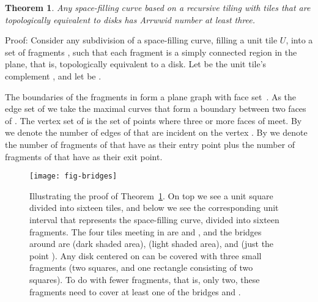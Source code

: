 \documentclass[11pt,a4paper]{article}
\newcommand{\unittile}{\ensuremath{U}\xspace}
\newtheorem{theorem}{Theorem}
\newenvironment{proof}{Proof:}{\qed}
\def\squareforqed{\hbox{\rlap{}}}
\def\qed{\ifmmode\squareforqed\else{\unskip\nobreak\hfil
\penalty50\hskip1em\null\nobreak\hfil\squareforqed
\parfillskip=0pt\finalhyphendemerits=0\endgraf}\fi}
\begin{document}
\begin{theorem}\label{th:2dsfclb}
Any space-filling curve based on a recursive tiling with tiles that are topologically equivalent to disks has Arrwwid number at least three.
\end{theorem}
\begin{proof}
Consider any subdivision of a space-filling curve, filling a unit tile \unittile, into a set  of  fragments , such that each fragment is a simply connected region in the plane, that is, topologically equivalent to a disk. Let  be the unit tile's complement , and let  be .

The boundaries of the fragments in  form a plane graph  with face set~. As the edge set  of  we take the maximal curves that form a boundary between two faces of . The vertex set  of  is the set of points where three or more faces of  meet. By  we denote the number of edges of  that are incident on the vertex . By  we denote the number of fragments of  that have  as their entry point plus the number of fragments of  that have  as their exit point.

\begin{figure}
\centering
\texttt{[image: fig-bridges]}
\caption{Illustrating the proof of Theorem~\ref{th:2dsfclb}. On top we see a unit square divided into sixteen tiles, and below we see the corresponding unit interval that represents the space-filling curve, divided into sixteen fragments. The four tiles meeting in  are  and , and the bridges around  are  (dark shaded area),  (light shaded area), and  (just the point ). Any disk  centered on  can be covered with three small fragments (two squares, and one rectangle consisting of two squares). To do with fewer fragments, that is, only two, these fragments need to cover at least one of the bridges  and .}
\label{fig:bridges}
\end{figure}


\end{proof}
\end{document}
